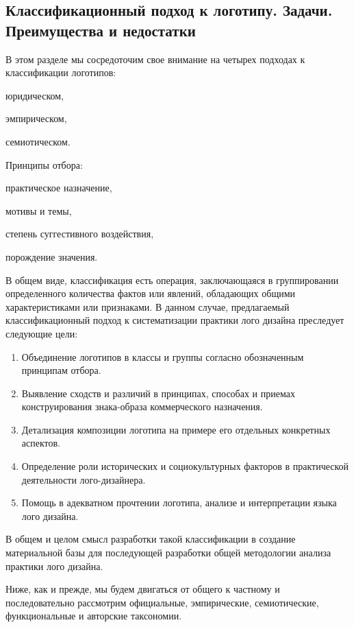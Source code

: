 \subsection{Классификационный подход к логотипу. Задачи. Преимущества и недостатки}

В этом разделе мы сосредоточим свое внимание на четырех подходах к классификации логотипов:
\begin{enumerate*}[label=\arabic*)]
\item юридическом,
\item эмпирическом,
\item семиотическом.
\end{enumerate*}
Принципы отбора:
\begin{enumerate*}[label=\asbuk*)]
\item практическое назначение,
\item мотивы и темы,
\item степень суггестивного воздействия,
\item порождение значения.
\end{enumerate*}

В общем виде, классификация есть операция, заключающаяся в группировании определенного количества
фактов или явлений, обладающих общими характеристиками или признаками. В данном случае, предлагаемый
классификационный подход к систематизации практики лого дизайна преследует следующие цели:
\begin{enumerate}
\item Объединение логотипов в классы и группы согласно обозначенным принципам отбора.
\item Выявление сходств и различий в принципах, способах и приемах конструирования знака-образа коммерческого назначения.
\item Детализация композиции логотипа на примере его отдельных конкретных аспектов.
\item Определение роли исторических и социокультурных факторов в практической деятельности лого-дизайнера.
\item Помощь в адекватном прочтении логотипа, анализе и интерпретации языка лого дизайна.
\end{enumerate}

В общем и целом смысл разработки такой классификации в создание материальной базы для последующей
разработки общей методологии анализа практики лого дизайна.

Ниже, как и прежде, мы будем двигаться от общего к частному и последовательно рассмотрим
официальные, эмпирические, семиотические, функциональные и авторские таксономии.

